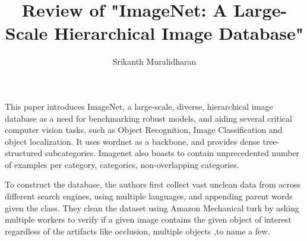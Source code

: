 \documentclass[]{article}
\title{Review of "ImageNet: A Large-Scale Hierarchical Image Database"}
\author{Srikanth Muralidharan}
\begin{document}
\maketitle

This paper introduces ImageNet, a large-scale, diverse, hierarchical image database as a need for benchmarking robust models, and aiding several critical computer vision tasks, 
such as Object Recognition, Image Classification and object localization. It uses wordnet as a backbone, and provides dense
tree-structured subcategories. Imagenet also boasts to contain unprecedented number of examples per category, categories,
non-overlapping categories.

To construct the database, the authors first collect vast unclean data from across different search engines, using multiple
languages, and appending parent words given the class. They clean the dataset using Amazon Mechanical turk by
asking multiple workers to verify if a given image contains the given object of interest regardless of the artifacts like occlusion,
multiple objects ,to name a few.
\end{document}
